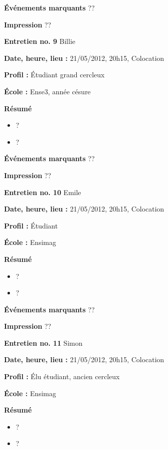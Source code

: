 \documentclass[a4paper, 11px]{article}
\begin{document}
\textbf{Événements marquants}
??

\textbf{Impression}
??



\vspace{.3cm}

 \textbf {\large Entretien no. 9}
Billie

\textbf{Date, heure, lieu : }
21/05/2012, 20h15, Colocation

\textbf{Profil : }
Étudiant grand cercleux

\textbf{École : }
Ense3, année césure

\textbf{Résumé}
	\begin{itemize}
		\item ?
		\item ?
	\end{itemize}

\textbf{Événements marquants}
??

\textbf{Impression}
??



\vspace{.3cm}

 \textbf {\large Entretien no. 10}
Emile

\textbf{Date, heure, lieu : }
21/05/2012, 20h15, Colocation

\textbf{Profil : }
Étudiant

\textbf{École : }
Ensimag

\textbf{Résumé}
	\begin{itemize}
		\item ?
		\item ?
	\end{itemize}

\textbf{Événements marquants}
??

\textbf{Impression}
??


\vspace{.3cm}

 \textbf {\large Entretien no. 11}
Simon

\textbf{Date, heure, lieu : }
21/05/2012, 20h15, Colocation

\textbf{Profil : }
Élu étudiant, ancien cercleux

\textbf{École : }
Ensimag

\textbf{Résumé}
	\begin{itemize}
		\item ?
		\item ?
	\end{itemize}
\end{document}
